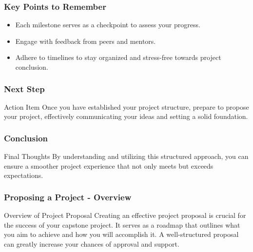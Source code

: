 \documentclass[aspectratio=169]{beamer}
\begin{document}
\begin{frame}[fragile]
    \frametitle{Key Points to Remember}
    \begin{itemize}
        \item Each milestone serves as a checkpoint to assess your progress.
        \item Engage with feedback from peers and mentors.
        \item Adhere to timelines to stay organized and stress-free towards project conclusion.
    \end{itemize}
\end{frame}

\begin{frame}[fragile]
    \frametitle{Next Step}
    \begin{block}{Action Item}
        Once you have established your project structure, prepare to propose your project, effectively communicating your ideas and setting a solid foundation.
    \end{block}
\end{frame}

\begin{frame}[fragile]
    \frametitle{Conclusion}
    \begin{block}{Final Thoughts}
        By understanding and utilizing this structured approach, you can ensure a smoother project experience that not only meets but exceeds expectations.
    \end{block}
\end{frame}

\begin{frame}[fragile]
    \frametitle{Proposing a Project - Overview}
    \begin{block}{Overview of Project Proposal}
        Creating an effective project proposal is crucial for the success of your capstone project. It serves as a roadmap that outlines what you aim to achieve and how you will accomplish it. A well-structured proposal can greatly increase your chances of approval and support.
    \end{block}
\end{frame}
\end{document}
